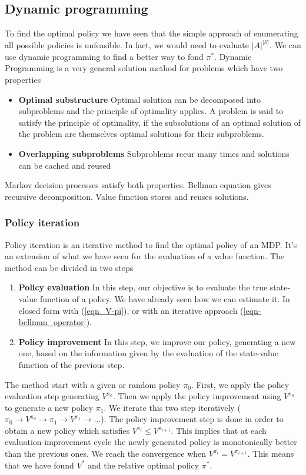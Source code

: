 \documentclass[main.tex]{subfiles}
\begin{document}
\subsection{Dynamic programming}
To find the optimal policy we have seen that the simple approach of enumerating all possible policies is unfeasible. In fact, we would need to evaluate $|A|^{|S|}$. We can use dynamic programming to find a better way to fond $\pi^*$. Dynamic Programming is a very general solution method for problems
which have two properties
\begin{itemize}
    \item \textbf{Optimal substructure} Optimal solution can be decomposed into subproblems and the principle of optimality applies. A problem is said to satisfy the principle of optimality, if the subsolutions of an optimal solution of the problem are themselves optimal solutions for their subproblems.
    \item \textbf{Overlapping subproblems} Subproblems recur many times and solutions can be cached and reused
\end{itemize}
Markov decision processes satisfy both properties. Bellman equation gives recursive decomposition. Value function stores and reuses solutions.

\subsubsection{Policy iteration}
Policy iteration is an iterative method to find the optimal policy of an MDP. It's an extension of what we have seen for the evaluation of a value function. The method can be divided in two steps
\begin{enumerate}
    \item \textbf{Policy evaluation} In this step, our objective is to evaluate the true state-value function of a policy. We have already seen how we can estimate it. In closed form with (\ref{eqn_V-pi}), or with an iterative approach (\ref{eqn-bellman_operator}).
    \item \textbf{Policy improvement} In this step, we improve our policy, generating a new one, based on the information given by the evaluation of the state-value function of the previous step.
\end{enumerate}
The method start with a given or random policy $\pi_0$. First, we apply the policy evaluation step generating $V^{\pi_0}$. Then we apply the policy improvement using $V^{\pi_0}$ to generate a new policy $\pi_1$. We iterate this two step iteratively ($\pi_0 \rightarrow V^{\pi_0} \rightarrow \pi_1 \rightarrow V^{\pi_1} \rightarrow \dots $). The policy improvement step is done in order to obtain a new policy which satisfies $V^{\pi_i} \leq V^{\pi_{i+1}}$. This implies that at each evaluation-improvement cycle the newly generated policy is monotonically better than the previous ones. We reach the convergence when $V^{\pi_i} = V^{\pi_{i+1}}$. This means that we have found $V^*$ and the relative optimal policy $\pi^*$.
\end{document}
